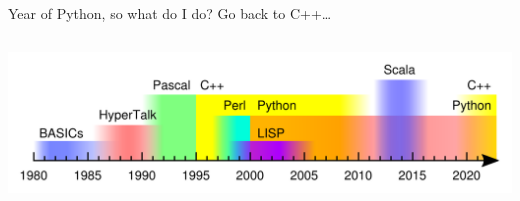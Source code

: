 \documentclass[aspectratio=169]{beamer}
\begin{document}
\begin{frame}{Year of Python, so what do I do? Go back to C++\ldots}
\vspace{0.5 cm}
\begin{columns}
\includegraphics[width=\linewidth]{personal-programming-languages.pdf}
\end{columns}
\end{frame}
\end{document}

